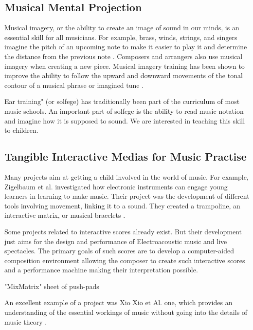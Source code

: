 \subsection{Musical Mental Projection}

Musical imagery, or the ability to create an image of sound in our minds, is an essential
skill for all musicians. For example, brass, winds, strings, and singers imagine the
pitch of an upcoming note to make it easier to play it and determine the distance from
the previous note
\cite{zatorre2005mental}. Composers and arrangers also use musical imagery when creating
a new piece. Musical imagery training has been shown to improve the ability to follow
the upward and downward movements of the tonal contour of a musical phrase or
imagined tune
\cite{weber1986musical}.

Ear training" (or solfege) has traditionally been part of the curriculum of most music
schools. An important part of solfege is the ability to read music notation and imagine
how it is supposed to sound. We are interested in teaching this skill to children.


\subsection{Tangible Interactive Medias for Music Practise}

Many projects aim at getting a child involved in the world of music. For example, Zigelbaum et al. investigated how electronic instruments can engage young learners in learning to make music. Their project was the development of different tools involving movement, linking it to a sound. They created a trampoline, an interactive matrix, or musical bracelets \cite{zigelbaum2006bodybeats}.

Some projects related to interactive scores already exist. But their development just aims for the design and performance of Electroacoustic music \cite{struc_inter_music_score} and live spectacles. The primary goals of such scores are to develop a computer-aided composition environment allowing the composer to create such interactive scores and a performance machine making their interpretation possible.

"MixMatrix" sheet of push-pads

An excellent example of a project was Xio Xio et Al. one, which provides an understanding of the essential workings of music without going into the details of music theory \cite{xiao2014andante}.

